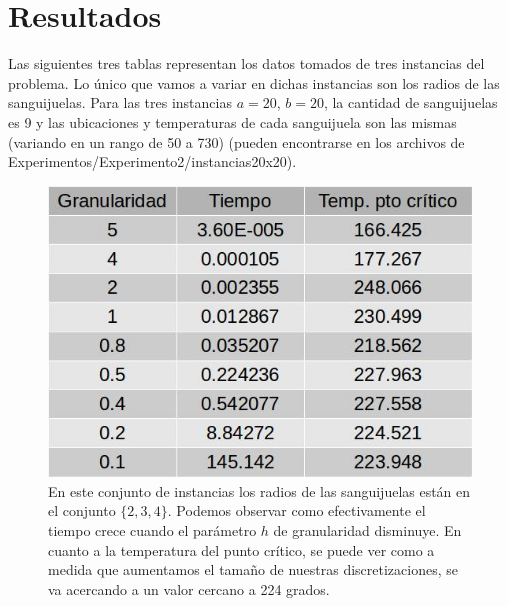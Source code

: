 \section{Resultados}
Las siguientes tres tablas representan los datos tomados de tres instancias del problema. Lo único que vamos a variar en dichas instancias son los radios de las sanguijuelas. Para las tres instancias $a = 20$, $b = 20$, la cantidad de sanguijuelas es 9 y las ubicaciones y temperaturas de cada sanguijuela son las mismas (variando en un rango de 50 a 730) (pueden encontrarse en los archivos de Experimentos/Experimento2/instancias20x20).
\newline
\begin{figure}[H]
\centering
\includegraphics[scale=0.4]{../../Experimentos/Experimento2/instancia20x20_1.jpg}\caption{En este conjunto de instancias los radios de las sanguijuelas están en el conjunto $\{2, 3, 4\}$. Podemos observar como efectivamente el tiempo crece cuando el parámetro $h$ de granularidad disminuye. En cuanto a la temperatura del punto crítico, se puede ver como a medida que aumentamos el tamaño de nuestras discretizaciones, se va acercando a un valor cercano a 224 grados.}
\end{figure}

